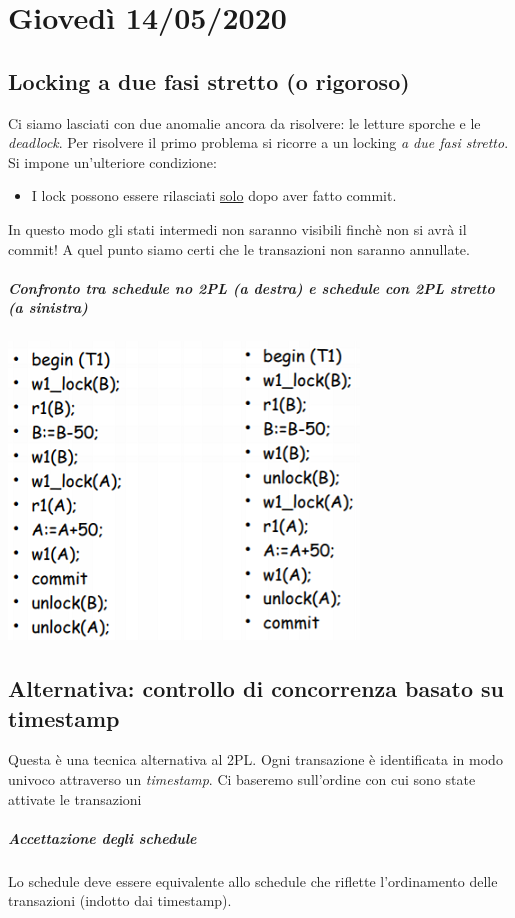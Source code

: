 \chapter{Giovedì 14/05/2020}
\section{Locking a due fasi stretto (o rigoroso)}
Ci siamo lasciati con due anomalie ancora da risolvere: le letture sporche e le \emph{deadlock}. Per risolvere il primo problema si ricorre a un locking \emph{a due fasi stretto}. Si impone un'ulteriore condizione:
\begin{itemize}
	\item I lock possono essere rilasciati \underline{solo} dopo aver fatto commit.
\end{itemize}
In questo modo gli stati intermedi non saranno visibili finchè non si avrà il commit! A quel punto siamo certi che le transazioni non saranno annullate.
\paragraph{Confronto tra schedule no 2PL (a destra) e schedule con 2PL stretto (a sinistra)}
\begin{center}\includegraphics{images/169.PNG}\end{center}
\section{Alternativa: controllo di concorrenza basato su timestamp}
Questa è una tecnica alternativa al 2PL.  Ogni transazione è identificata in modo univoco attraverso un \emph{timestamp}. Ci baseremo sull'ordine con cui sono state attivate le transazioni
\paragraph{Accettazione degli schedule} Lo schedule deve essere equivalente allo schedule che riflette l'ordinamento delle transazioni (indotto dai timestamp).
